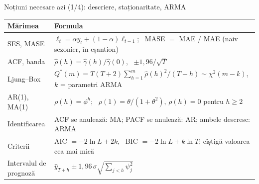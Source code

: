 \begin{frame}{Noțiuni necesare azi (1/4): descriere, staționaritate, ARMA}
\itemsize{\small}
{\renewcommand{\arraystretch}{1.3}\begin{center}
\footnotesize
\begin{tabular}{l>{\raggedright\arraybackslash}p{9.4cm}}
\toprule
\textbf{Mărimea} & \textbf{Formula} \\
\midrule
SES, MASE & $\ell_t = \alpha y_t + (1 - \alpha)\ell_{t-1}$; \ MASE $=$ MAE / MAE (naiv sezonier, în eșantion) \\
ACF, banda & $\hat\rho(h) = \hat\gamma(h)/\hat\gamma(0)$, \ $\pm 1{,}96/\sqrt{T}$ \\
Ljung--Box & $Q^*(m) = T(T + 2)\sum_{h=1}^{m}\hat\rho(h)^2/(T - h) \sim \chi^2(m - k)$, $k$ = parametri ARMA \\
AR(1), MA(1) & $\rho(h) = \phi^h$; \ $\rho(1) = \theta/(1 + \theta^2)$, $\rho(h) = 0$ pentru $h \ge 2$ \\
Identificarea & ACF se anulează: MA; PACF se anulează: AR; ambele descresc: ARMA \\
Criterii & AIC $= -2\ln L + 2k$, \ BIC $= -2\ln L + k\ln T$; cîștigă valoarea cea mai mică \\
Intervalul de prognoză & $\hat y_{T+h} \pm 1{,}96\,\sigma\sqrt{\sum_{j<h}\psi_j^2}$ \\
\bottomrule
\end{tabular}
\end{center}
}
\end{frame}

